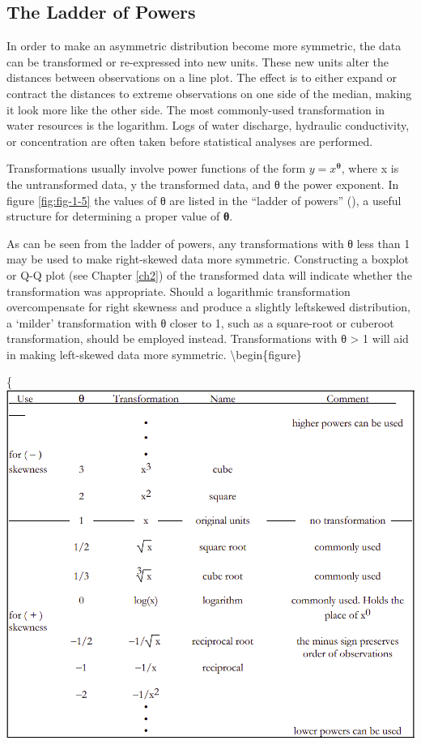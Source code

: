 \documentclass[]{book}
\begin{document}
\hypertarget{the-ladder-of-powers}{%
\subsection{The Ladder of Powers}\label{the-ladder-of-powers}}

In order to make an asymmetric distribution become more symmetric, the data can be transformed or re-expressed into new units. These new units alter the distances between observations on a line plot. The effect is to either expand or contract the distances to extreme observations on one side of the median, making it look more like the other side. The most commonly-used transformation in water resources is the logarithm. Logs of water discharge, hydraulic conductivity, or concentration are often taken before statistical analyses are performed.

Transformations usually involve power functions of the form \(y = x^{\mathbf{θ}}\), where x is the untransformed data, y the transformed data, and θ the power exponent. In figure \ref{fig:fig-1-5} the values of θ are listed in the ``ladder of powers'' (\citet{velleman_applications_1981}), a useful structure for determining a proper value of \textbf{θ}.

As can be seen from the ladder of powers, any transformations with θ less than 1 may be used to make right-skewed data more symmetric. Constructing a boxplot or Q-Q plot (see Chapter \ref{ch2}) of the transformed data will indicate whether the transformation was appropriate. Should a logarithmic transformation overcompensate for right skewness and produce a slightly leftskewed distribution, a `milder' transformation with θ closer to 1, such as a square-root or cuberoot transformation, should be employed instead. Transformations with θ \textgreater{} 1 will aid in making left-skewed data more symmetric.
\textbackslash{}begin\{figure\}

\{\centering \includegraphics{figures/1_5}
\end{document}
